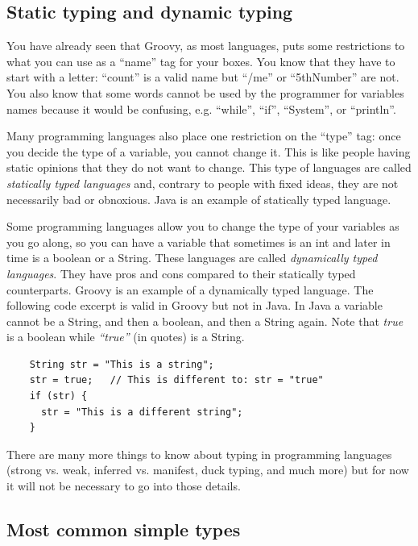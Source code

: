 \subsection{Static typing and dynamic typing}
\label{sec:strong-typing-weak}

You have already seen that Groovy, as most languages, puts some
restrictions to what you can use as a ``name'' tag for your boxes. You
know that they have to start with a letter: ``count'' is a valid name
but ``/me'' or ``5thNumber'' are not. You also know that some words
cannot be used by the programmer for variables names because it would
be confusing, e.g. ``while'', ``if'', ``System'', or ``println''.

Many programming languages also place one restriction on the ``type''
tag: once you decide the type of a variable, you cannot change
it. This is like people having static opinions that they do not want
to change. This type of languages are called \emph{statically typed
  languages} and, contrary to people with fixed ideas, they are
not necessarily bad or obnoxious. Java is an example of
statically typed language. 

Some programming languages allow you to change the type of your
variables as you go along, so you can have a variable that sometimes
is an int and later in time is a boolean or a String. These languages
are called \emph{dynamically typed languages}. They have pros and cons
compared to their statically typed counterparts. Groovy is an example
of a dynamically typed language. The following code excerpt is valid
in Groovy but not in Java. In Java a variable cannot be a String, and
then a boolean, and then a String again. Note that \emph{true} is a
boolean while \emph{``true''} (in quotes) is a String. 

\begin{verbatim}
    String str = "This is a string";
    str = true;   // This is different to: str = "true"
    if (str) {
      str = "This is a different string";
    }
\end{verbatim}

There are many more things to know about typing in programming
languages (strong vs. weak, inferred vs. manifest, duck typing, and
much more) but for now it will not be necessary to go into those
details. 

\subsection{Most common simple types}
\label{sec:most-common-simple}

